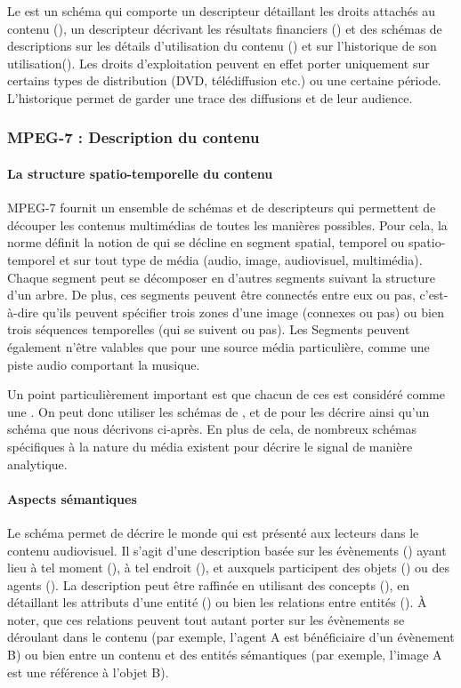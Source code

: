 Le  est un schéma qui comporte un descripteur détaillant les droits attachés au contenu (), un descripteur décrivant les résultats financiers () et des schémas de descriptions sur les détails d'utilisation du contenu () et sur l'historique de son utilisation().
Les droits d'exploitation peuvent en effet porter uniquement sur certains types de distribution (DVD, télédiffusion etc.) ou une certaine période. 
L'historique permet de garder une trace des diffusions et de leur audience.


\subsubsection{MPEG-7 : Description du contenu}\label{sec:mpeg7-dc}
\paragraph{La structure spatio-temporelle du contenu}
MPEG-7 fournit un ensemble de schémas et de descripteurs qui permettent de découper les contenus multimédias de toutes les manières possibles. 
Pour cela, la norme définit la notion de  qui se décline en segment spatial, temporel ou spatio-temporel et sur tout type de média (audio, image, audiovisuel, multimédia). 
Chaque segment peut se décomposer en d'autres segments suivant la structure d'un arbre. 
De plus, ces segments peuvent être connectés entre eux ou pas, c'est-à-dire qu'ils peuvent spécifier trois zones d'une image (connexes ou pas) ou bien trois séquences temporelles (qui se suivent ou pas). 
Les Segments peuvent également n'être valables que pour une source média particulière, comme une piste audio comportant la musique.

Un point particulièrement important est que chacun de ces  est considéré comme une . 
On peut donc utiliser les schémas de ,  et de  pour les décrire ainsi qu'un schéma  que nous décrivons ci-après. 
En plus de cela, de nombreux schémas spécifiques à la nature du média existent pour décrire le signal de manière analytique. 


\paragraph{Aspects sémantiques}
Le schéma  permet de décrire le monde qui est présenté aux lecteurs dans le contenu audiovisuel. 
Il s'agit d'une description basée sur les évènements () ayant lieu à tel moment (), à tel endroit (), et auxquels participent des objets () ou des agents (). 
La description peut être raffinée en utilisant des concepts (), en détaillant les attributs d'une entité () ou bien les relations entre entités ().
À noter, que ces relations peuvent tout autant porter sur les évènements se déroulant dans le contenu (par exemple, l'agent A est bénéficiaire d'un évènement B) ou bien entre un contenu et des entités sémantiques (par exemple, l'image A est une référence à l'objet B).

